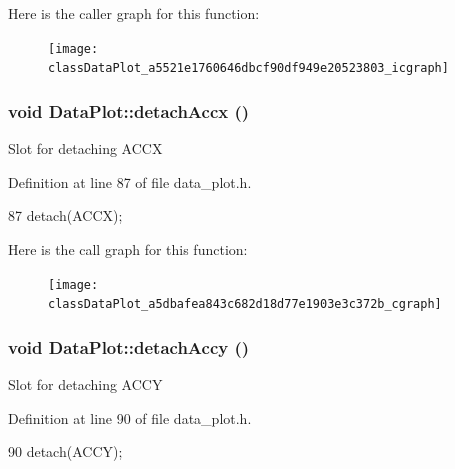 Here is the caller graph for this function:\nopagebreak
\begin{figure}[H]
\begin{center}
\leavevmode
\texttt{[image: classDataPlot\_a5521e1760646dbcf90df949e20523803\_icgraph]}
\end{center}
\end{figure}


\hypertarget{classDataPlot_a5dbafea843c682d18d77e1903e3c372b}{
\subsubsection[{detachAccx}]{\setlength{\rightskip}{0pt plus 5cm}void DataPlot::detachAccx ()}}
\label{classDataPlot_a5dbafea843c682d18d77e1903e3c372b}
Slot for detaching ACCX 

Definition at line 87 of file data\_\-plot.h.




\begin{DoxyCode}
87 { detach(ACCX); }
\end{DoxyCode}




Here is the call graph for this function:\nopagebreak
\begin{figure}[H]
\begin{center}
\leavevmode
\texttt{[image: classDataPlot\_a5dbafea843c682d18d77e1903e3c372b\_cgraph]}
\end{center}
\end{figure}


\hypertarget{classDataPlot_ab9a27391ec25592f1126f672716ab161}{
\subsubsection[{detachAccy}]{\setlength{\rightskip}{0pt plus 5cm}void DataPlot::detachAccy ()}}
\label{classDataPlot_ab9a27391ec25592f1126f672716ab161}
Slot for detaching ACCY 

Definition at line 90 of file data\_\-plot.h.




\begin{DoxyCode}
90 { detach(ACCY); }
\end{DoxyCode}




